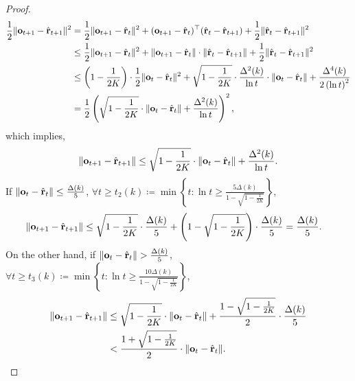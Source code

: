 \begin{proof}
\begin{equation*}
	\begin{split}
	\frac{1}{2} \| {\mathbf{o}}_{t+1} - \hat{{\mathbf{r}}}_{t+1}\|^2 &= \frac{1}{2} \| {\mathbf{o}}_{t+1} - \hat{{\mathbf{r}}}_t\|^2 + ( {\mathbf{o}}_{t+1} - \hat{{\mathbf{r}}}_t )^\top ( \hat{{\mathbf{r}}}_t - \hat{{\mathbf{r}}}_{t+1} ) + \frac{1}{2} \| \hat{{\mathbf{r}}}_t - \hat{{\mathbf{r}}}_{t+1} \|^2 \\
	&\le \frac{1}{2} \| {\mathbf{o}}_{t+1} - \hat{{\mathbf{r}}}_t\|^2 + \| {\mathbf{o}}_{t+1} - \hat{{\mathbf{r}}}_t \| \cdot \| \hat{{\mathbf{r}}}_t - \hat{{\mathbf{r}}}_{t+1} \| + \frac{1}{2} \| \hat{{\mathbf{r}}}_t - \hat{{\mathbf{r}}}_{t+1} \|^2 \\
	&\le \left( 1 - \frac{1}{2 K} \right) \cdot \frac{1}{2} \| {\mathbf{o}}_t - \hat{{\mathbf{r}}}_t\|^2 + \sqrt{1 - \frac{1}{2 K} } \cdot \frac{\Delta^2(k)}{\ln{t}} \cdot \| {\mathbf{o}}_t  - \hat{{\mathbf{r}}}_t\| + \frac{\Delta^4(k)}{2 \left( \ln{t} \right)^2 } \\
	&= \frac{1}{2} \left( \sqrt{1 - \frac{1}{2 K} } \cdot \| {\mathbf{o}}_t - \hat{{\mathbf{r}}}_t\| + \frac{\Delta^2(k)}{\ln{t}} \right)^2,
	\end{split}
	\end{equation*}
	which implies,
	\begin{equation*}
	    \| {\mathbf{o}}_{t+1}  - \hat{{\mathbf{r}}}_{t+1}\| \le \sqrt{1 - \frac{1}{2 K} } \cdot \| {\mathbf{o}}_t - \hat{{\mathbf{r}}}_t\| + \frac{\Delta^2(k)}{\ln{t}}.
	\end{equation*}
	If $\| {\mathbf{o}}_t - \hat{{\mathbf{r}}}_t\| \le \frac{\Delta(k)}{5}$, $\forall t \ge t_2(k) \coloneqq \min\left\{ t: \ln{t} \ge \frac{5 \Delta(k) }{1 - \sqrt{1 - \frac{1}{2 K}}} \right\}$,
	\begin{equation*}
	\begin{split}
	\| {\mathbf{o}}_{t+1}  - \hat{{\mathbf{r}}}_{t+1}\| &\le \sqrt{1 - \frac{1}{2 K}} \cdot \frac{\Delta(k)}{5} + \left(1 - \sqrt{1 - \frac{1}{2 K}}\right) \cdot \frac{\Delta(k)}{5} = \frac{\Delta(k)}{5}.
	\end{split}
	\end{equation*}
	On the other hand, if $\| {\mathbf{o}}_t  - \hat{{\mathbf{r}}}_t\| > \frac{\Delta(k)}{5}$, $\forall t \ge t_3(k) \coloneqq \min\left\{ t: \ln{t} \ge \frac{10 \Delta(k)}{1 - \sqrt{1 - \frac{1}{2 K}}} \right\}$,
	\begin{equation*}
	\begin{split}
	\| {\mathbf{o}}_{t+1}  - \hat{{\mathbf{r}}}_{t+1}\| &\le \sqrt{1 - \frac{1}{2 K}} \cdot \| {\mathbf{o}}_t - \hat{{\mathbf{r}}}_t\| + \frac{1 - \sqrt{1 - \frac{1}{2 K}}}{2} \cdot \frac{\Delta(k)}{5} \\
	&< \frac{1 + \sqrt{1 - \frac{1}{2 K}}}{2} \cdot \| {\mathbf{o}}_t - \hat{{\mathbf{r}}}_t\|.
	\end{split}
	\end{equation*}

\end{proof}
